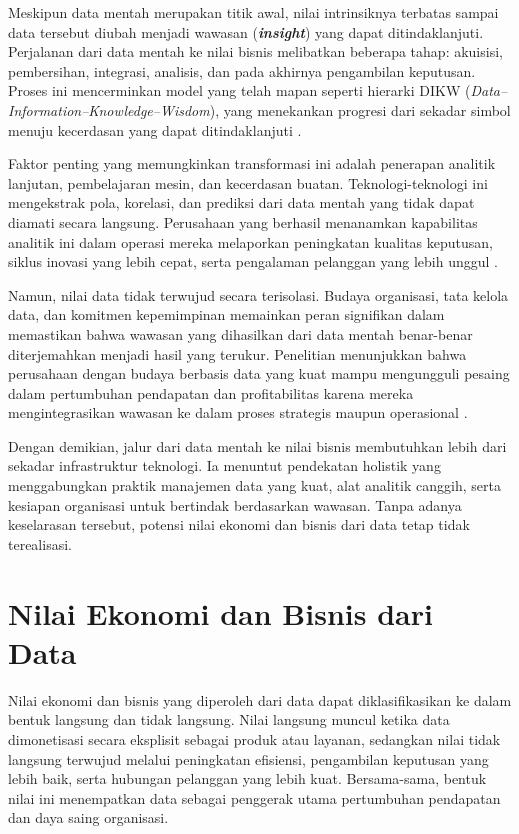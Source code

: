 Meskipun data mentah merupakan titik awal, nilai intrinsiknya terbatas sampai data tersebut diubah menjadi wawasan (\textit{\textbf{insight}}) yang dapat ditindaklanjuti. Perjalanan dari data mentah ke nilai bisnis melibatkan beberapa tahap: akuisisi, pembersihan, integrasi, analisis, dan pada akhirnya pengambilan keputusan. Proses ini mencerminkan model yang telah mapan seperti hierarki DIKW (\textit{Data–Information–Knowledge–Wisdom}), yang menekankan progresi dari sekadar simbol menuju kecerdasan yang dapat ditindaklanjuti \cite{rowley2007wisdom}.

Faktor penting yang memungkinkan transformasi ini adalah penerapan analitik lanjutan, pembelajaran mesin, dan kecerdasan buatan. Teknologi-teknologi ini mengekstrak pola, korelasi, dan prediksi dari data mentah yang tidak dapat diamati secara langsung. Perusahaan yang berhasil menanamkan kapabilitas analitik ini dalam operasi mereka melaporkan peningkatan kualitas keputusan, siklus inovasi yang lebih cepat, serta pengalaman pelanggan yang lebih unggul \cite{chen2014business,mariani2018bigdata}.

Namun, nilai data tidak terwujud secara terisolasi. Budaya organisasi, tata kelola data, dan komitmen kepemimpinan memainkan peran signifikan dalam memastikan bahwa wawasan yang dihasilkan dari data mentah benar-benar diterjemahkan menjadi hasil yang terukur. Penelitian menunjukkan bahwa perusahaan dengan budaya berbasis data yang kuat mampu mengungguli pesaing dalam pertumbuhan pendapatan dan profitabilitas karena mereka mengintegrasikan wawasan ke dalam proses strategis maupun operasional \cite{provost2013datascience,lavalle2011bigdata}.

Dengan demikian, jalur dari data mentah ke nilai bisnis membutuhkan lebih dari sekadar infrastruktur teknologi. Ia menuntut pendekatan holistik yang menggabungkan praktik manajemen data yang kuat, alat analitik canggih, serta kesiapan organisasi untuk bertindak berdasarkan wawasan. Tanpa adanya keselarasan tersebut, potensi nilai ekonomi dan bisnis dari data tetap tidak terealisasi.


\section{Nilai Ekonomi dan Bisnis dari Data}

Nilai ekonomi dan bisnis yang diperoleh dari data dapat diklasifikasikan ke dalam bentuk langsung dan tidak langsung. Nilai langsung muncul ketika data dimonetisasi secara eksplisit sebagai produk atau layanan, sedangkan nilai tidak langsung terwujud melalui peningkatan efisiensi, pengambilan keputusan yang lebih baik, serta hubungan pelanggan yang lebih kuat. Bersama-sama, bentuk nilai ini menempatkan data sebagai penggerak utama pertumbuhan pendapatan dan daya saing organisasi.

